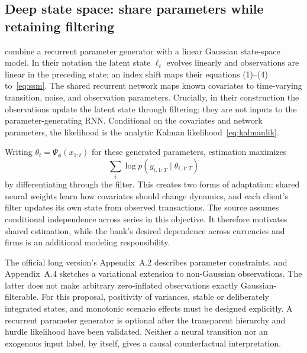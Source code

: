 \subsection{Deep state space: share parameters while retaining filtering}
\citet{rangapuram2018} combine a recurrent parameter generator with a linear Gaussian state-space model. In their notation the latent state $\ell_t$ evolves linearly and observations are linear in the preceding state; an index shift maps their equations (1)--(4) to~\eqref{eq:ssm}. The shared recurrent network maps known covariates to time-varying transition, noise, and observation parameters. Crucially, in their construction the observations update the latent state through filtering; they are not inputs to the parameter-generating RNN. Conditional on the covariates and network parameters, the likelihood is the analytic Kalman likelihood~\eqref{eq:kalmanlik}.

Writing $\theta_t=\Psi_\phi(x_{1:t})$ for these generated parameters, estimation maximizes
\begin{equation}
\sum_i\log p(y_{i,1:T}\mid\theta_{i,1:T})
\end{equation}
by differentiating through the filter. This creates two forms of adaptation: shared neural weights learn how covariates should change dynamics, and each client's filter updates its own state from observed transactions. The source assumes conditional independence across series in this objective. It therefore motivates shared estimation, while the bank's desired dependence across currencies and firms is an additional modeling responsibility.

The official long version's Appendix~A.2 describes parameter constraints, and Appendix~A.4 sketches a variational extension to non-Gaussian observations. The latter does not make arbitrary zero-inflated observations exactly Gaussian-filterable. For this proposal, positivity of variances, stable or deliberately integrated states, and monotonic scenario effects must be designed explicitly. A recurrent parameter generator is optional after the transparent hierarchy and hurdle likelihood have been validated. Neither a neural transition nor an exogenous input label, by itself, gives a causal counterfactual interpretation.
